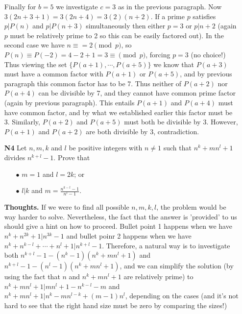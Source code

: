 \documentclass[11pt,a4paper]{article}
\begin{document}
\begin{itemize}
Finally for $b=5$ we investigate $c=3$ as in the previous paragraph. 
Now $3(2n+3+1)=3(2n+4)=3(2)(n+2)$. 
If a prime $p$ satisfies $p|P(n)$ and $p|P(n+3)$ simultaneously then either $p=3$ or $p|n+2$ 
(again $p$ must be relatively prime to 2 so this can be easily factored out). 
In the second case we have $n\equiv =2\pmod{p}$, 
so $P(n)\equiv P(-2)=4-2+1=3\equiv\pmod{p}$, forcing $p=3$ (no choice!) 
Thus viewing the set $\{P(a+1), \cdots , P(a+5)\}$ 
we know that $P(a+3)$ must have a common factor with $P(a+1)$ or $P(a+5)$, and by previous paragraph this common factor has to be 7. 
Thus neither of $P(a+2)$ nor $P(a+4)$ can be divisible by 7, and they cannot have common prime factor (again by previous paragraph). 
This entails $P(a+1)$ and $P(a+4)$ must have common factor, and by what we established earlier this factor must be 3. 
Similarly, $P(a+2)$ and $P(a+5)$ must both be divisible by 3. 
However, $P(a+1)$ and $P(a+2)$ are both divisible by 3, contradiction. 


\newpage

\item[\textbf{N4}]
Let $n, m, k$ and $l$ be positive integers with $n \neq 1$ such that $n^k + mn^l + 1$ divides $n^{k+l} - 1$. Prove that
\begin{itemize}
\item[$\bullet$] $m = 1$ and $l = 2k$; or
\item[$\bullet$] $l|k$ and $m = \frac{n^{k-l}-1}{n^l-1}$.
\end{itemize}

\textbf{Thoughts.} If we were to find all possible $n, m , k , l$, the problem would be way harder to solve. Nevertheless, the fact that the answer is 'provided' to us should give a hint on how to proceed. Bullet point 1 happens when we have $n^k+n^{2k}+1|n^{3k}-1$ and bullet poinr 2 happens when we have $n^k+n^{k-l}+\cdots +n^l+1|n^{k+l}-1$. Therefore, a natural way is to investigate both $n^{k+l}-1-(n^k-1)(n^k+mn^l+1)$ and $n^{k+l}-1-(n^l-1)(n^k+mn^l+1)$, and we can simplify the solution (by using the fact that $n$ and $n^k+mn^l+1$ are relatively prime) to $n^k+mn^l+1|mn^{l}+1-n^{k-l}-m$ and $n^k+mn^l+1|n^k-mn^{l-k}+(m-1)n^l$, depending on the cases (and it's not hard to see that the right hand size must be zero by comparing the sizes!)


\end{itemize}
\end{document}
